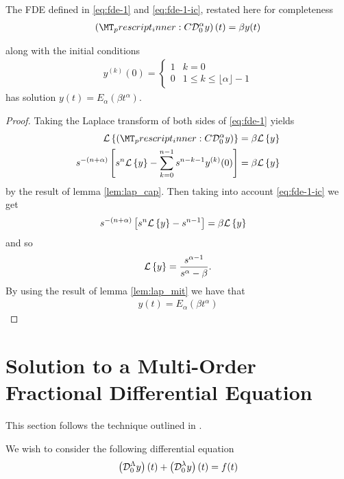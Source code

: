 \documentclass{unswmaths}
\begin{document}
\begin{lemma}
	The FDE defined in \eqref{eq:fde-1} and \eqref{eq:fde-1-ic}, restated here for completeness 
	\begin{align*}
		\left( \prescript{C}{}{\mathcal{D}_0^\alpha}y \right)(t) = \beta y(t) 
	\end{align*}

	along with the initial conditions 
	\begin{align*}
		y^{(k)}(0) = 
		\begin{cases}
			1 & k = 0 \\
			0 & 1 \leq k \leq \lfloor \alpha \rfloor - 1  
		\end{cases}
	\end{align*}
	has solution $ y(t) = E_\alpha \left( \beta t^\alpha \right) $.
\end{lemma}
\begin{proof}
	Taking the Laplace transform of both sides of \eqref{eq:fde-1} yields
	\begin{align*}
		\laplace{\capder{0}{\alpha}{y}} &= \beta \laplace{y} \\
		s^{-(n+\alpha)} \left[s^n \laplace{y} - \sum_{k=0}^{n-1} s^{n-k-1} y^{(k)}(0) \right] &= \beta \laplace{y}
	\end{align*}
	by the result of lemma \ref{lem:lap_cap}. 
	Then taking into account \eqref{eq:fde-1-ic} we get
	\begin{align*}
		s^{-(n+\alpha)} \left[s^n \mathcal{L} \left\{ y \right\} - s^{n-1}\right] &= \beta \mathcal{L} \left\{ y \right\}
	\end{align*}
	and so 
	\begin{align*}
		\mathcal{L} \left\{ y \right\} = \frac{s^{\alpha-1}}{s^\alpha - \beta}.
	\end{align*}
	By using the result of lemma \ref{lem:lap_mit} we have that 
	\begin{align*}
		y(t) = E_\alpha(\beta t^\alpha)
	\end{align*}
\end{proof}

\section*{Solution to a Multi-Order Fractional Differential Equation}
This section follows the technique outlined in \cite{Podlubny1999}.

We wish to consider the following differential equation
\begin{align}
	\label{eq:fde-multi-order}
	\left( \mathcal{D}_{0}^{\Lambda} y \right)(t) + \left( \mathcal{D}_{0}^{\lambda} y \right)(t) = f(t)
\end{align}
\end{document}
